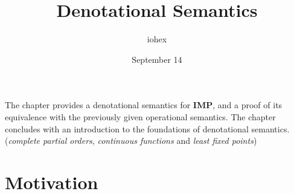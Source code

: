 \documentclass[a4paper, 12pt]{article}
\author{iohex}
\date{September 14}
\title{Denotational Semantics}
\begin{document}
    \maketitle
%
The chapter provides a denotational semantics for \textbf{IMP}, and a proof of its equivalence with the previously given operational semantics. 
The chapter concludes with an introduction to the foundations of denotational semantics.
(\emph{complete partial orders}, \emph{continuous functions} and \emph{least fixed points})

\section{Motivation}
\label{s:motiv}
    
\end{document}
